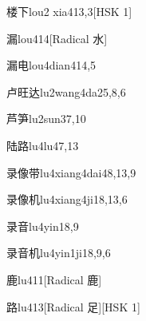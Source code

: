 \begin{entry}{楼下}{lou2 xia4}{13,3}[HSK 1]
\end{entry}

\begin{entry}{漏}{lou4}{14}[Radical 水]
\end{entry}

\begin{entry}{漏电}{lou4dian4}{14,5}
\end{entry}

\begin{entry}{卢旺达}{lu2wang4da2}{5,8,6}
\end{entry}

\begin{entry}{芦笋}{lu2sun3}{7,10}
\end{entry}

\begin{entry}{陆路}{lu4lu4}{7,13}
\end{entry}

\begin{entry}{录像带}{lu4xiang4dai4}{8,13,9}
\end{entry}

\begin{entry}{录像机}{lu4xiang4ji1}{8,13,6}
\end{entry}

\begin{entry}{录音}{lu4yin1}{8,9}
\end{entry}

\begin{entry}{录音机}{lu4yin1ji1}{8,9,6}
\end{entry}

\begin{entry}{鹿}{lu4}{11}[Radical 鹿]
\end{entry}

\begin{entry}{路}{lu4}{13}[Radical 足][HSK 1]
\end{entry}

